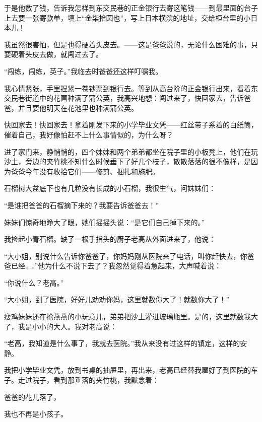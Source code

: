 \par 于是他数了钱，告诉我怎样到东交民巷的正金银行去寄这笔钱——到最里面的台子上去要一张寄款单，填上“金柒拾圆也”，写上日本横滨的地址，交给柜台里的小日本儿！
\par 我虽然很害怕，但是也得硬着头皮去。——这是爸爸说的，无论什么困难的事，只要硬着头皮去做，就闯过去了。
\par “闯练，闯练，英子。”我临去时爸爸还这样叮嘱我。
\par 我心情紧张，手里捏紧一卷钞票到银行去。等到从高台阶的正金银行出来，看着东交民巷街道中的花圃种满了蒲公英，我高兴地想：闯过来了，快回家去，告诉爸爸，并且要他明天在花池里也种满蒲公英。
\par 快回家去！快回家去！拿着刚发下来的小学毕业文凭——红丝带子系着的白纸筒，催着自己，我好像怕赶不上什么事情似的，为什么呀？
\par 进了家门来，静悄悄的，四个妹妹和两个弟弟都坐在院子里的小板凳上，他们在玩沙土，旁边的夹竹桃不知什么时候垂下了好几个枝子，散散落落的很不像样，是因为爸爸今年没有收拾它们——修剪、捆扎和施肥。
\par 石榴树大盆底下也有几粒没有长成的小石榴，我很生气，问妹妹们：
\par “是谁把爸爸的石榴摘下来的？我要告诉爸爸去！”
\par 妹妹们惊奇地睁大了眼，她们摇摇头说：“是它们自己掉下来的。”
\par 我捡起小青石榴。缺了一根手指头的厨子老高从外面进来了，他说：
\par “大小姐，别说什么告诉你爸爸了，你妈妈刚从医院来了电话，叫你赶快去，你爸爸已经……”他为什么不说下去了？我忽然觉得着急起来，大声喊着说：
\par “你说什么？老高。”
\par “大小姐，到了医院，好好儿劝劝你妈，这里就数你大了！就数你大了！”
\par 瘦鸡妹妹还在抢燕燕的小玩意儿，弟弟把沙土灌进玻璃瓶里。是的，这里就数我大了，我是小小的大人。我对老高说：
\par “老高，我知道是什么事了，我就去医院。”我从来没有过这样的镇定，这样的安静。
\par 我把小学毕业文凭，放到书桌的抽屉里，再出来，老高已经替我雇好了到医院的车子。走过院子，看到那垂落的夹竹桃，我默念着：
\par 爸爸的花儿落了，
\par 我也不再是小孩子。






